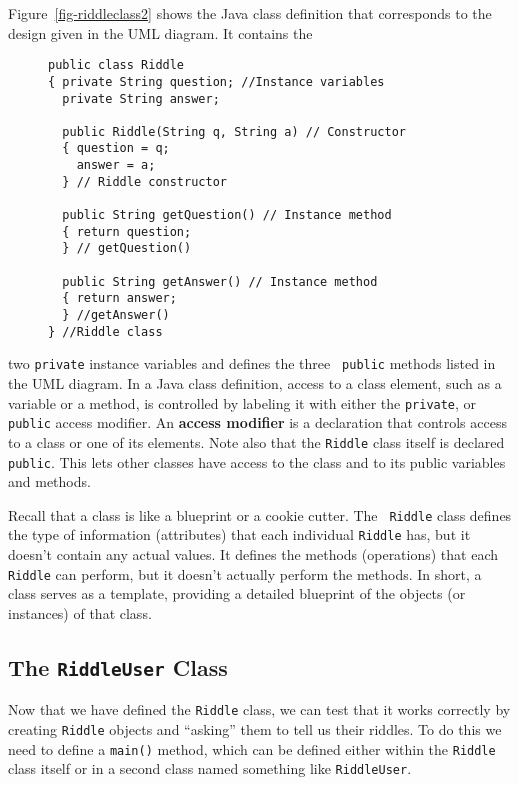 Figure~\ref{fig-riddleclass2} shows the Java class definition that
corresponds to the design given in the UML diagram.  It contains the
\begin{figure}[h!]
\jjjprogstart
\begin{jjjlisting}
\begin{lstlisting}
public class Riddle
{ private String question; //Instance variables
  private String answer;

  public Riddle(String q, String a) // Constructor
  { question = q;
    answer = a;
  } // Riddle constructor

  public String getQuestion() // Instance method
  { return question;
  } // getQuestion()

  public String getAnswer() // Instance method
  { return answer;
  } //getAnswer()
} //Riddle class
\end{lstlisting}
\end{jjjlisting}
\end{figure}
two {\tt private} instance variables and defines the three {\tt
public} methods listed in the UML diagram. In a Java class definition,
access to a class element, such as a variable or a method, is
controlled by labeling it with either the {\tt private}, or {\tt
public} access modifier. An {\bf access modifier} is a declaration
that controls access to a class or one of its elements.  Note also
that the {\tt Riddle} class itself is declared {\tt public}.  This
lets other classes have access to the class and to its public
variables and methods.


Recall that a class is like a blueprint or a cookie cutter. The {\tt
Riddle} class defines the type of information (attributes) that each
individual {\tt Riddle} has, but it doesn't contain any actual values.
It defines the methods (operations) that each {\tt Riddle} can
perform, but it doesn't actually perform the methods.  In short, a
class serves as a template, providing a detailed blueprint of the
objects (or instances) of that class.

\subsection{The {\tt RiddleUser} Class}

\noindent Now that we have defined the {\tt Riddle} class, we can
test that it works correctly by creating {\tt Riddle} objects
and ``asking'' them to tell us their riddles.  To do this we need
to define a {\tt main()} method, which can be defined either within
the {\tt Riddle} class itself or in a second class named something
like {\tt RiddleUser}.  

